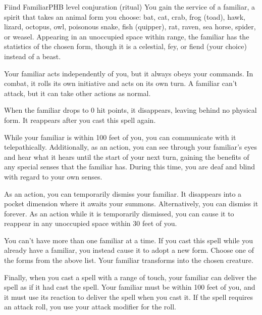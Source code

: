 \begin{spell}{Fiind Familiar}{PHB}{ level conjuration (ritual)}
{
}
You gain the service of a familiar, a spirit that takes an
animal form you choose: bat, cat, crab, frog (toad), hawk,
lizard, octopus, owl, poisonous snake, fish (quipper),
rat, raven, sea horse, spider, or weasel. Appearing in
an unoccupied space within range, the familiar has the
statistics of the chosen form, though it is a celestial, fey,
or fiend (your choice) instead of a beast.

Your familiar acts independently of you, but it always
obeys your commands. In combat, it rolls its own
initiative and acts on its own turn. A familiar can't
attack, but it can take other actions as normal.

When the familiar drops to 0 hit points, it disappears,
leaving behind no physical form. It reappears after you
cast this spell again.

While your familiar is within 100 feet of you, you
can communicate with it telepathically. Additionally,
as an action, you can see through your familiar's eyes
and hear what it hears until the start of your next turn,
gaining the benefits of any special senses that the
familiar has. During this time, you are deaf and blind
with regard to your own senses.

As an action, you can temporarily dismiss your
familiar. It disappears into a pocket dimension where it
awaits your summons. Alternatively, you can dismiss it
forever. As an action while it is temporarily dismissed,
you can cause it to reappear in any unoccupied space
within 30 feet of you.

You can't have more than one familiar at a time. If you
cast this spell while you already have a familiar, you
instead cause it to adopt a new form. Choose one of the
forms from the above list. Your familiar transforms into
the chosen creature.

Finally, when you cast a spell with a range of touch,
your familiar can deliver the spell as if it had cast the
spell. Your familiar must be within 100 feet of you, and
it must use its reaction to deliver the spell when you cast
it. If the spell requires an attack roll, you use your attack
modifier for the roll.
\end{spell}